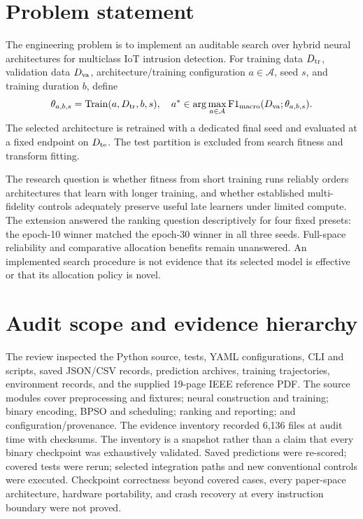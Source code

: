 \documentclass[11pt,a4paper]{report}
\begin{document}
\section{Problem statement}
The engineering problem is to implement an auditable search over hybrid neural architectures for multiclass IoT intrusion detection. For training data $D_{\rm tr}$, validation data $D_{\rm va}$, architecture/training configuration $a\in\mathcal A$, seed $s$, and training duration $b$, define
\begin{equation}
 \theta_{a,b,s}=\operatorname{Train}(a,D_{\rm tr},b,s),\quad
 a^*\in\arg\max_{a\in\mathcal A}\mathrm{F1}_{\mathrm{macro}}(D_{\rm va};\theta_{a,b,s}).
\end{equation}
The selected architecture is retrained with a dedicated final seed and evaluated at a fixed endpoint on $D_{\rm te}$. The test partition is excluded from search fitness and transform fitting.

The research question is whether fitness from short training runs reliably orders architectures that learn with longer training, and whether established multi-fidelity controls adequately preserve useful late learners under limited compute. The extension answered the ranking question descriptively for four fixed presets: the epoch-10 winner matched the epoch-30 winner in all three seeds. Full-space reliability and comparative allocation benefits remain unanswered. An implemented search procedure is not evidence that its selected model is effective or that its allocation policy is novel.

\section{Audit scope and evidence hierarchy}
The review inspected the Python source, tests, YAML configurations, CLI and scripts, saved JSON/CSV records, prediction archives, training trajectories, environment records, and the supplied 19-page IEEE reference PDF. The source modules cover preprocessing and fixtures; neural construction and training; binary encoding, BPSO and scheduling; ranking and reporting; and configuration/provenance. The evidence inventory recorded 6,136 files at audit time with checksums. The inventory is a snapshot rather than a claim that every binary checkpoint was exhaustively validated. Saved predictions were re-scored; covered tests were rerun; selected integration paths and new conventional controls were executed. Checkpoint correctness beyond covered cases, every paper-space architecture, hardware portability, and crash recovery at every instruction boundary were not proved.
\end{document}
